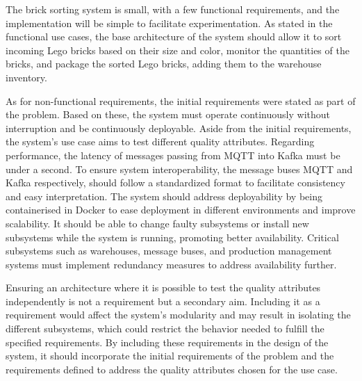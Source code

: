 The brick sorting system is small, with a few functional requirements, and the implementation will be simple to facilitate experimentation. As stated in the functional use cases, the base architecture of the system should allow it to sort incoming Lego bricks based on their size and color, monitor the quantities of the bricks, and package the sorted Lego bricks, adding them to the warehouse inventory.



As for non-functional requirements, the initial requirements were stated as part of the problem. Based on these, the system must operate continuously without interruption and be continuously deployable. Aside from the initial requirements, the system's use case aims to test different quality attributes. Regarding performance, the latency of messages passing from MQTT into Kafka must be under a second. To ensure system interoperability, the message buses MQTT and Kafka respectively, should follow a standardized format to facilitate consistency and easy interpretation. The system should address deployability by being containerised in Docker to ease deployment in different environments and improve scalability. It should be able to change faulty subsystems or install new subsystems while the system is running, promoting better availability. Critical subsystems such as warehouses, message buses, and production management systems must implement redundancy measures to address availability further.

Ensuring an architecture where it is possible to test the quality attributes independently is not a requirement but a secondary aim. Including it as a requirement would affect the system's modularity and may result in isolating the different subsystems, which could restrict the behavior needed to fulfill the specified requirements. 
By including these requirements in the design of the system, it should incorporate the initial requirements of the problem and the requirements defined to address the quality attributes chosen for the use case. 
